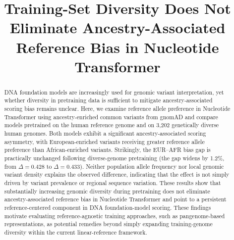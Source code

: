 \documentclass[conference]{IEEEtran}
\begin{document}
\title{Training-Set Diversity Does Not Eliminate Ancestry-Associated\\
Reference Bias in Nucleotide Transformer}

\author{
}

\maketitle

\begin{abstract}
DNA foundation models are increasingly used for genomic variant interpretation,
yet whether diversity in pretraining data is sufficient to mitigate
ancestry-associated scoring bias remains unclear. Here, we examine reference
allele preference in Nucleotide Transformer using ancestry-enriched common
variants from gnomAD and compare models pretrained on the human reference genome
and on 3{,}202 genetically diverse human genomes. Both models exhibit a
significant ancestry-associated scoring asymmetry, with European-enriched
variants receiving greater reference allele preference than African-enriched
variants. Strikingly, the EUR--AFR bias gap is practically unchanged following
diverse-genome pretraining (the gap widens by 1.2\%, from $\Delta{=}0.428$ to $\Delta{=}0.433$). Neither population allele frequency nor local
genomic variant density explains the observed difference, indicating that the
effect is not simply driven by variant prevalence or regional sequence variation.
These results show that substantially increasing genomic diversity during
pretraining does not eliminate ancestry-associated reference bias in Nucleotide
Transformer and point to a persistent reference-centered component in DNA
foundation-model scoring. These findings motivate evaluating reference-agnostic training approaches,
such as pangenome-based representations, as potential remedies beyond
simply expanding training-genome diversity within the current linear-reference
framework.
\end{abstract}
\end{document}
